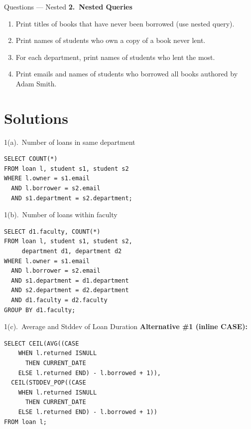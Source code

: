 \documentclass{beamer}
\begin{document}
\begin{frame}{Questions — Nested}
\footnotesize
\textbf{2.\ Nested Queries}
\begin{enumerate}
  \item[(a)] Print titles of books that have never been borrowed (use nested query).
  \item[(b)] Print names of students who own a copy of a book never lent.
  \item[(c)] For each department, print names of students who lent the most.
  \item[(d)] Print emails and names of students who borrowed all books authored by Adam Smith.
\end{enumerate}
\end{frame}

\section{Solutions}
\begin{frame}[fragile]{1(a).\ Number of loans in same department}
\begin{lstlisting}
SELECT COUNT(*)
FROM loan l, student s1, student s2
WHERE l.owner = s1.email
  AND l.borrower = s2.email
  AND s1.department = s2.department;
\end{lstlisting}
\end{frame}

\begin{frame}[fragile]{1(b).\ Number of loans within faculty}
\begin{lstlisting}
SELECT d1.faculty, COUNT(*)
FROM loan l, student s1, student s2,
     department d1, department d2
WHERE l.owner = s1.email
  AND l.borrower = s2.email
  AND s1.department = d1.department
  AND s2.department = d2.department
  AND d1.faculty = d2.faculty
GROUP BY d1.faculty;
\end{lstlisting}
\end{frame}

\begin{frame}[fragile]{1(c).\ Average and Stddev of Loan Duration}
\textbf{Alternative \#1 (inline CASE):}
\begin{lstlisting}
SELECT CEIL(AVG((CASE
    WHEN l.returned ISNULL
      THEN CURRENT_DATE
    ELSE l.returned END) - l.borrowed + 1)),
  CEIL(STDDEV_POP((CASE
    WHEN l.returned ISNULL
      THEN CURRENT_DATE
    ELSE l.returned END) - l.borrowed + 1))
FROM loan l;
\end{lstlisting}
\end{frame}
\end{document}
